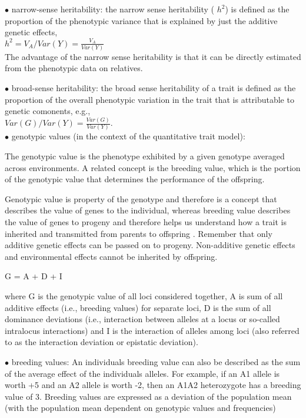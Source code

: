 \documentclass{article}
\begin{document}
\vspace{1pc}
$\bullet$ narrow-sense heritability:
the narrow sense heritability ( $h^2 $) is defined as the proportion of the phenotypic variance that is explained by just the additive genetic effects, \\

	$ 
		h^2 = V_A / Var(Y) = \frac{V_A}{Var(Y)} 
	$ \\
	
	The advantage of the narrow sense heritability is that it can be directly estimated from the phenotypic data on relatives.

\vspace{1pc}
$\bullet$ broad-sense heritability:
the broad sense heritability of a trait is defined as the proportion of the overall phenotypic variation in the trait that is attributable to genetic comonents, e.g., \\

	$ 
		Var(G)/Var(Y) = \frac{Var(G)}{Var(Y)}.
	$ \\
	



\vspace{1pc}
$\bullet$ genotypic values (in the context of the quantitative trait model):

The genotypic value is the phenotype exhibited by a given genotype averaged across environments. A related concept is the breeding value, which is the portion of the genotypic value that determines the performance of the offspring.

Genotypic value is property of the genotype and therefore is a concept that describes the value of genes to the individual, whereas breeding value describes the value of genes to progeny and therefore helps us understand how a trait is inherited and transmitted from parents to offspring . Remember that only additive genetic effects can be passed on to progeny. Non-additive genetic effects and environmental effects cannot be inherited by offspring.

  G = A + D + I

where G is the genotypic value of all loci considered together, A is sum of all additive effects (i.e., breeding values) for separate loci, D is the sum of all dominance deviations (i.e., interaction between alleles at a locus or so-called intralocus interactions) and I is the interaction of alleles among loci (also referred to as the interaction deviation or epistatic deviation).


\vspace{1pc}
$\bullet$ breeding values:
An individuals breeding value can also be described as the sum of the average effect of the individuals alleles.
For example, if an A1 allele is worth +5 and an A2 allele is worth -2, then an A1A2 heterozygote has a breeding value of 3.
Breeding values are expressed as a deviation of the population mean (with the population mean dependent on genotypic values and frequencies)
\end{document}
